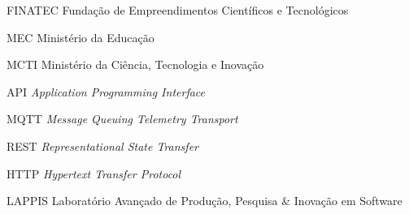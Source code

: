 \begin{siglas}
  \item [FINATEC] Fundação de Empreendimentos Científicos e Tecnológicos
  \item [MEC] Ministério da Educação
  \item [MCTI] Ministério da Ciência, Tecnologia e Inovação
  \item [API] \textit{Application Programming Interface}
  \item [MQTT] \textit{Message Queuing Telemetry Transport}
  \item [REST] \textit{Representational State Transfer}
  \item [HTTP] \textit{Hypertext Transfer Protocol}
  \item [LAPPIS] Laboratório Avançado de Produção, Pesquisa & Inovação em Software

\end{siglas}
